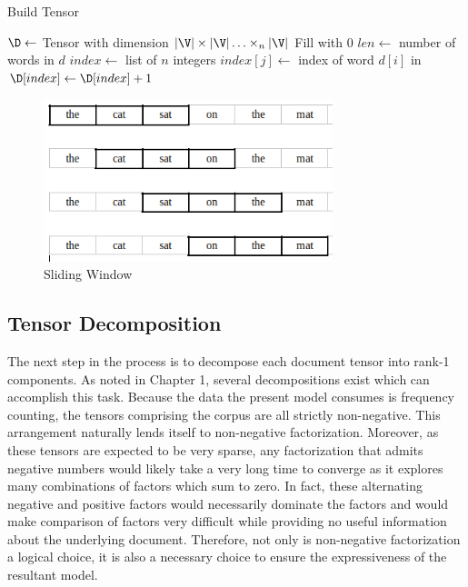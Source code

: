 \documentclass[../ut-dissertation.tex]{subfiles}
\begin{document}
\begin{algorithm}[p]
  \caption{Build Tensor}
  \label{alg:BuildTensor}
    
  
  \Output{\D}
  \BlankLine
  $\D \leftarrow $ Tensor with dimension $|\V| \times |\V| \ldots
  \times_n |\V|$\;
  Fill \D with 0\;
  $len \leftarrow$ number of words in $d$\;
   {
    $index \leftarrow$ list of $n$ integers\;
     {
      $index[j] \leftarrow$ index of word $d[i]$ in \V\;
    }
    $\D[index] \leftarrow \D[index] + 1$\;
  }
  \Return{\D}
\end{algorithm}

\begin{figure}[p]
  \begin{center}
    \includegraphics[width=0.75\textwidth]{diagrams/sliding-window}
  \end{center}
  \caption{Sliding Window}
  \label{fig:SlidingWindow}
\end{figure}
\FloatBarrier

\subsection{Tensor Decomposition}
The next step in the process is to decompose each document tensor into
rank-1 components.  As noted in Chapter 1, several decompositions
exist which can accomplish this task.  Because the data the present
model consumes is frequency counting, the tensors comprising the
corpus are all strictly non-negative.  This arrangement naturally
lends itself to non-negative factorization.  Moreover, as these
tensors are expected to be very sparse, any factorization that admits
negative numbers would likely take a very long time to converge as it
explores many combinations of factors which sum to zero.  In fact,
these alternating negative and positive factors would necessarily
dominate the factors and would make comparison of factors very
difficult while providing no useful information about the underlying
document.  Therefore, not only is non-negative factorization a logical
choice, it is also a necessary choice to ensure the expressiveness of
the resultant model.
\end{document}
